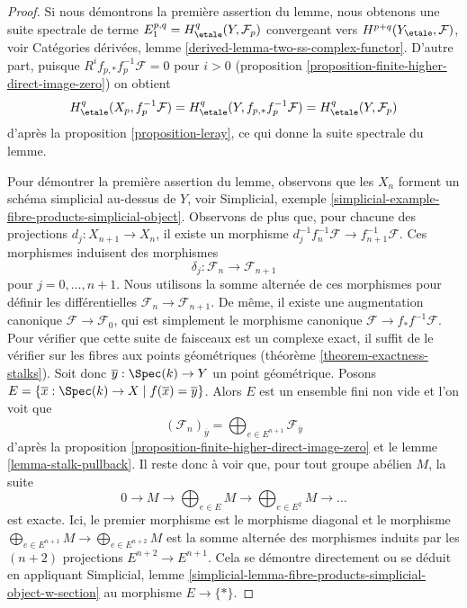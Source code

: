 \begin{proof}
Si nous d\'emontrons la premi\`ere assertion du lemme, nous obtenons une suite
spectrale de terme $E_1^{p, q} = H^q_\etale(Y, \mathcal{F}_p)$ convergeant
vers $H^{p + q}(Y_\etale, \mathcal{F})$, voir
Cat\'egories d\'eriv\'ees, lemme \ref{derived-lemma-two-ss-complex-functor}.
D'autre part, puisque
$R^if_{p, *}f_p^{-1}\mathcal{F} = 0$ pour $i > 0$
(proposition \ref{proposition-finite-higher-direct-image-zero})
on obtient
$$
H^q_\etale(X_p, f_p^{-1}\mathcal{F}) =
H^q_\etale(Y, f_{p, *}f_p^{-1} \mathcal{F}) =
H^q_\etale(Y, \mathcal{F}_p)
$$
d'apr\`es la proposition \ref{proposition-leray},
ce qui donne la suite spectrale du lemme.

\medskip\noindent
Pour d\'emontrer la premi\`ere assertion du lemme, observons que
les $X_n$ forment un sch\'ema simplicial au-dessus de $Y$, voir
Simplicial, exemple \ref{simplicial-example-fibre-products-simplicial-object}.
Observons de plus que, pour chacune des projections
$d_j : X_{n + 1} \to X_n$, il existe un morphisme
$d_j^{-1} f_n^{-1}\mathcal{F} \to f_{n + 1}^{-1}\mathcal{F}$.
Ces morphismes induisent des morphismes
$$
\delta_j : \mathcal{F}_n \to \mathcal{F}_{n + 1}
$$
pour $j = 0, \ldots, n + 1$. Nous utilisons la somme altern\'ee de ces morphismes
pour d\'efinir les diff\'erentielles $\mathcal{F}_n \to \mathcal{F}_{n + 1}$.
De m\^eme, il existe une augmentation canonique $\mathcal{F} \to \mathcal{F}_0$,
qui est simplement le morphisme canonique $\mathcal{F} \to f_*f^{-1}\mathcal{F}$.
Pour v\'erifier que cette suite de faisceaux est un complexe exact, il suffit
de le v\'erifier sur les fibres aux points g\'eom\'etriques (th\'eor\`eme \ref{theorem-exactness-stalks}).
Soit donc $\overline{y} : \Spec(k) \to Y$ un point g\'eom\'etrique. Posons
$E = \{\overline{x} : \Spec(k) \to X \mid f(\overline{x}) = \overline{y}\}$.
Alors $E$ est un ensemble fini non vide et l'on voit que
$$
(\mathcal{F}_n)_{\overline{y}} =
\bigoplus\nolimits_{e \in E^{n + 1}} \mathcal{F}_{\overline{y}}
$$
d'apr\`es la proposition \ref{proposition-finite-higher-direct-image-zero}
et le lemme \ref{lemma-stalk-pullback}.
Il reste donc \`a voir que, pour tout groupe ab\'elien $M$, la suite
$$
0 \to M \to \bigoplus\nolimits_{e \in E} M \to
\bigoplus\nolimits_{e \in E^2} M \to \ldots
$$
est exacte. Ici, le premier morphisme est le morphisme diagonal et le morphisme
$\bigoplus_{e \in E^{n + 1}} M  \to \bigoplus_{e \in E^{n + 2}} M$
est la somme altern\'ee des morphismes induits par les $(n + 2)$
projections $E^{n + 2} \to E^{n + 1}$. Cela se d\'emontre directement
ou se d\'eduit en appliquant Simplicial, lemme
\ref{simplicial-lemma-fibre-products-simplicial-object-w-section}
au morphisme $E \to \{*\}$.
\end{proof}

